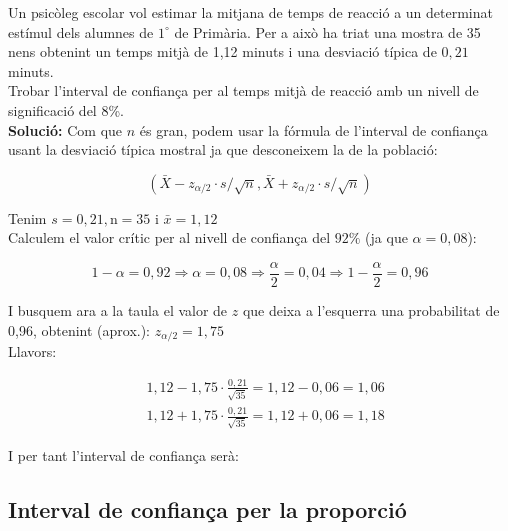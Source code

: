 \documentclass[12pt]{article}
\begin{document}
\begin{exemple} [title=Exemple 2:] \noindent

Un psicòleg escolar vol estimar la mitjana de temps de reacció a un determinat estímul dels alumnes de $1^{\circ}$ de Primària. Per a això ha triat una mostra de 35 nens obtenint un temps mitjà de 1,12 minuts i una desviació típica de $0,21$ minuts.\\ 

Trobar l'interval de confiança per al temps mitjà de reacció amb un nivell de significació del 8\%.\\

\textbf{Solució:}
Com que $n$ és gran, podem usar la fórmula de l'interval de confiança usant la desviació típica mostral ja que desconeixem la de la població:

$$
\left(\bar{X}-z_{\alpha / 2} \cdot s / \sqrt{n}, \bar{X}+z_{\alpha / 2} \cdot s / \sqrt{n}\right)
$$

Tenim $s=0,21, \mathrm{n}=35$ i $\bar{x}=1,12$\\

Calculem el valor crític per al nivell de confiança del $92 \%$ (ja que $\alpha=0,08$):

$$
1-\alpha=0,92 \Rightarrow \alpha=0,08 \Rightarrow \frac{\alpha}{2}=0,04 \Rightarrow 1-\frac{\alpha}{2}=0,96
$$

I busquem ara a la taula el valor de $z$ que deixa a l'esquerra una probabilitat de 0,96, obtenint (aprox.): $z_{\alpha / 2}=1,75$\\

Llavors:

$$
\begin{aligned}
& 1,12-1,75 \cdot \frac{0,21}{\sqrt{35}}=1,12-0,06=1,06 \\
& 1,12+1,75 \cdot \frac{0,21}{\sqrt{35}}=1,12+0,06=1,18
\end{aligned}
$$

I per tant l'interval de confiança serà: 
\end{exemple}

\subsection{Interval de confiança per la proporció}
\end{document}
